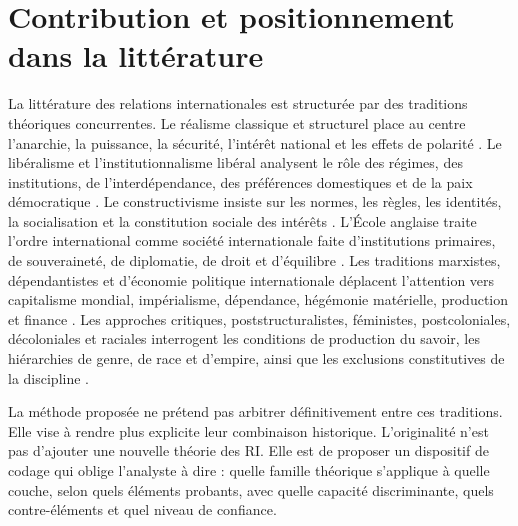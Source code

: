 \documentclass[11pt,a4paper]{article}
\begin{document}
\section{Contribution et positionnement dans la littérature}

La littérature des relations internationales est structurée par des traditions théoriques concurrentes. Le réalisme classique et structurel place au centre l'anarchie, la puissance, la sécurité, l'intérêt national et les effets de polarité \citep{morgenthau1948politics,waltz1979theory,mearsheimer2001tragedy}. Le libéralisme et l'institutionnalisme libéral analysent le rôle des régimes, des institutions, de l'interdépendance, des préférences domestiques et de la paix démocratique \citep{keohane1977power,keohane1984after,doyle1983kant,moravcsik1997taking}. Le constructivisme insiste sur les normes, les règles, les identités, la socialisation et la constitution sociale des intérêts \citep{onuf1989world,kratochwil1989rules,wendt1999social,finnemore1998norm}. L'École anglaise traite l'ordre international comme société internationale faite d'institutions primaires, de souveraineté, de diplomatie, de droit et d'équilibre \citep{wight1977systems,bull1977anarchical,watson1992evolution,buzan2014introduction}. Les traditions marxistes, dépendantistes et d'économie politique internationale déplacent l'attention vers capitalisme mondial, impérialisme, dépendance, hégémonie matérielle, production et finance \citep{hobson1902imperialism,lenin1917imperialism,frank1966development,cardoso1979dependency,wallerstein1974modern,cox1981social,gilpin1981war,strange1988states,strange1996retreat}. Les approches critiques, poststructuralistes, féministes, postcoloniales, décoloniales et raciales interrogent les conditions de production du savoir, les hiérarchies de genre, de race et d'empire, ainsi que les exclusions constitutives de la discipline \citep{ashley1984poverty,walker1993inside,tickner1992gender,enloe1989bananas,said1978orientalism,spivak1988subaltern,fanon1961wretched,vitalis2015white,acharya2019making}.

La méthode proposée ne prétend pas arbitrer définitivement entre ces traditions. Elle vise à rendre plus explicite leur combinaison historique. L'originalité n'est pas d'ajouter une nouvelle théorie des RI. Elle est de proposer un dispositif de codage qui oblige l'analyste à dire : quelle famille théorique s'applique à quelle couche, selon quels éléments probants, avec quelle capacité discriminante, quels contre-éléments et quel niveau de confiance.
\end{document}
